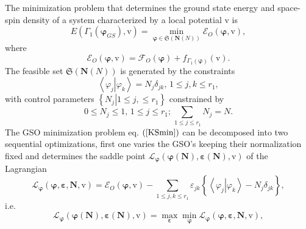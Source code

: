 \documentclass[aps,preprint]{revtex4}%
\begin{document}
The minimization problem that determines the ground state energy and
space-spin density of a system characterized by a local potential $\mathrm{v}$
is
\begin{equation}
E\left(  \Gamma_{1}\left(  \mathbf{\varphi}_{GS}\right)  \mathbf{,}%
\mathrm{v}\right)  =\min_{\mathbf{\varphi\in}\mathfrak{S}\left(
\mathbf{N}\left(  N\right)  \right)  }\mathcal{E}_{O}\left(  \mathbf{\varphi
,}\mathrm{v}\right)  , \label{KSmin}%
\end{equation}
where
\begin{equation}
\mathcal{E}_{O}\left(  \mathbf{\varphi,}\mathrm{v}\right)  =\mathcal{F}%
_{O}\left(  \mathbf{\varphi}\right)  +f_{\Gamma_{1}\left(  \mathbf{\varphi
}\right)  }\left(  \mathrm{v}\right)  .
\end{equation}
The feasible set $\mathfrak{S}\left(  \mathbf{N}\left(  N\right)  \right)  $
is generated by the constraints
\begin{equation}
\left\langle \left.  \varphi_{j}\right\vert \varphi_{k}\right\rangle
=N_{j}\delta_{jk},\,1\leq j,k\leq r_{1},
\end{equation}
with control parameters $\left\{  \left.  N_{j}\right\vert 1\leq j,\leq
r_{1}\right\}  $ constrained by
\begin{equation}
0\leq N_{j}\leq1,\,1\leq j\leq r_{1};\sum_{\,1\leq j\leq r_{1}}N_{j}=N.
\end{equation}
The GSO minimization problem eq. $\left(  \ref{KSmin}\right)  $ can be
decomposed into two sequential optimizations, first one varies the GSO's
keeping their normalization fixed and determines the saddle point
$\mathcal{L}_{\mathbf{\varphi}}\left(  \mathbf{\varphi}\left(  \mathbf{N}%
\right)  ,\mathbf{\varepsilon}\left(  \mathbf{N}\right)  ,\mathrm{v}\right)  $
of the Lagrangian
\begin{equation}
\mathcal{L}_{\mathbf{\varphi}}\left(  \mathbf{\varphi},\mathbf{\varepsilon
,N,}\mathrm{v}\right)  =\mathcal{E}_{O}\left(  \mathbf{\varphi,}%
\mathrm{v}\right)  -\sum_{1\leq j,k\leq r_{1}}\varepsilon_{jk}\left\{
\overset{}{\left\langle \left.  \varphi_{j}\right\vert \varphi_{k}%
\right\rangle -N_{j}\delta_{jk}}\right\}  ,
\end{equation}
i.e.
\begin{equation}
\mathcal{L}_{\mathbf{\varphi}}\left(  \mathbf{\varphi}\left(  \mathbf{N}%
\right)  ,\mathbf{\varepsilon}\left(  \mathbf{N}\right)  ,\mathrm{v}\right)
=\max_{\mathbf{\varepsilon}}\min_{\mathbf{\varphi}}\mathcal{L}%
_{\mathbf{\varphi}}\left(  \mathbf{\varphi},\mathbf{\varepsilon,N,}%
\mathrm{v}\right)  , \label{KSM1}%
\end{equation}
\end{document}
